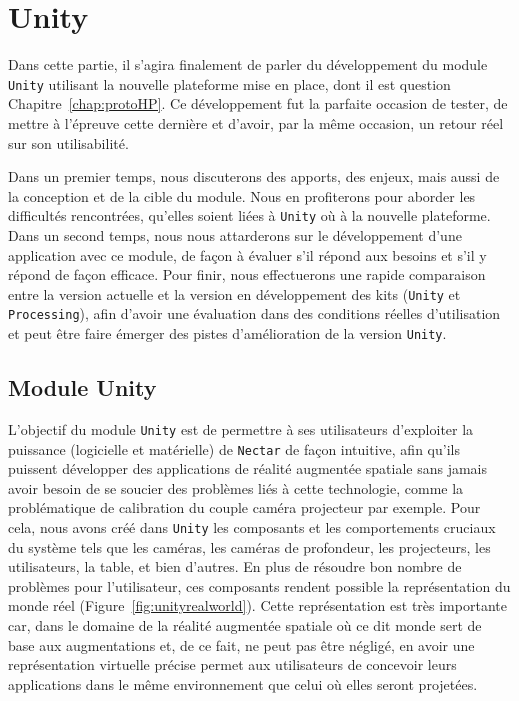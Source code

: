 \chapter{Unity}
\label{chap:unity}

Dans cette partie, il s'agira finalement de parler du développement du module \texttt{Unity} utilisant la nouvelle plateforme mise en place, dont il est question Chapitre~\ref{chap:protoHP}. Ce développement fut la parfaite occasion de tester, de mettre à l'épreuve cette dernière et d'avoir, par la même occasion, un retour réel sur son utilisabilité. 

Dans un premier temps, nous discuterons des apports, des enjeux, mais aussi de la conception et de la cible du module. Nous en profiterons pour aborder les difficultés rencontrées, qu'elles soient liées à \texttt{Unity} où à la nouvelle plateforme. Dans un second temps, nous nous attarderons sur le développement d'une application avec ce module, de façon à évaluer s'il répond aux besoins et s'il y répond de façon efficace. Pour finir, nous effectuerons une rapide comparaison entre la version actuelle et la version en développement des kits (\texttt{Unity} et \texttt{Processing}), afin d'avoir une évaluation dans des conditions réelles d'utilisation et peut être faire émerger des pistes d'amélioration de la version \texttt{Unity}.

\section{Module Unity}

L'objectif du module \texttt{Unity} est de permettre à ses utilisateurs d'exploiter la puissance (logicielle et matérielle) de \texttt{Nectar} de façon intuitive, afin qu'ils puissent développer des applications de réalité augmentée spatiale sans jamais avoir besoin de se soucier des problèmes liés à cette technologie, comme la problématique de calibration du couple caméra projecteur par exemple.
Pour cela, nous avons créé dans \texttt{Unity} les composants et les comportements cruciaux du système tels que les caméras, les caméras de profondeur, les projecteurs, les utilisateurs, la table, et bien d'autres. En plus de résoudre bon nombre de problèmes pour l'utilisateur, ces composants rendent possible la représentation du monde réel (Figure~\ref{fig:unityrealworld}). Cette représentation est très importante car, dans le domaine de la réalité augmentée spatiale où ce dit monde sert de base aux augmentations et, de ce fait, ne peut pas être négligé, en avoir une représentation virtuelle précise permet aux utilisateurs de concevoir leurs applications dans le même environnement que celui où elles seront projetées.\\

